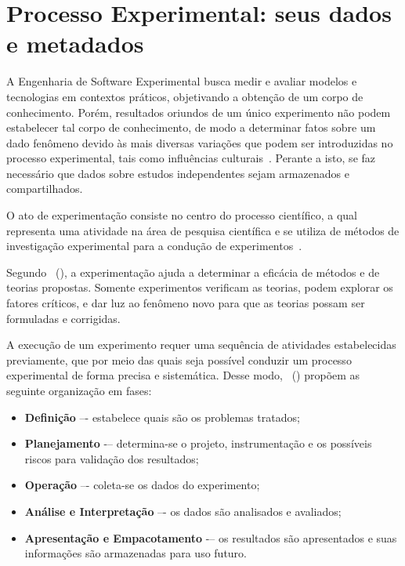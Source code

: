 \chapter{Processo Experimental: seus dados e metadados}
\label{cp:engenharia}

A Engenharia de Software Experimental busca medir e avaliar modelos e tecnologias em contextos práticos, objetivando a obtenção de um corpo de conhecimento. Porém, resultados oriundos de um único experimento não podem estabelecer tal corpo de conhecimento, de modo a determinar fatos sobre um dado fenômeno devido às mais diversas variações que podem ser introduzidas no processo experimental, tais como influências culturais~\cite{Basili99, Miller:2005, Shull03}. Perante a isto, se faz necessário que dados sobre estudos independentes sejam armazenados e compartilhados.

O ato de experimentação consiste no centro do processo científico, a qual representa uma atividade na área de pesquisa científica e se utiliza de métodos de investigação experimental para a condução de experimentos~\cite{Travassos02}. 

Segundo ~(\citeyear{Basili99}), a experimentação ajuda a determinar a eficácia de métodos e de teorias propostas. Somente experimentos verificam as teorias, podem explorar os fatores críticos, e dar luz ao fenômeno novo para que as teorias possam ser formuladas e corrigidas.

A execução de um experimento requer uma sequência de atividades estabelecidas previamente, que por meio das quais seja possível conduzir um processo experimental de forma precisa e sistemática. Desse modo, ~(\citeyear{Wohlin2012}) propõem as seguinte organização em fases: 
\begin{itemize}
\item \textbf{Definição} –- estabelece quais são os problemas tratados;
\item \textbf{Planejamento} -– determina-se o projeto, instrumentação e os possíveis riscos para validação dos resultados;
\item \textbf{Operação} –- coleta-se os dados do experimento;
\item \textbf{Análise e Interpretação} –- os dados são analisados e avaliados;
\item \textbf{Apresentação e Empacotamento} -– os resultados são apresentados e suas informações são armazenadas para uso futuro.
\end{itemize}

